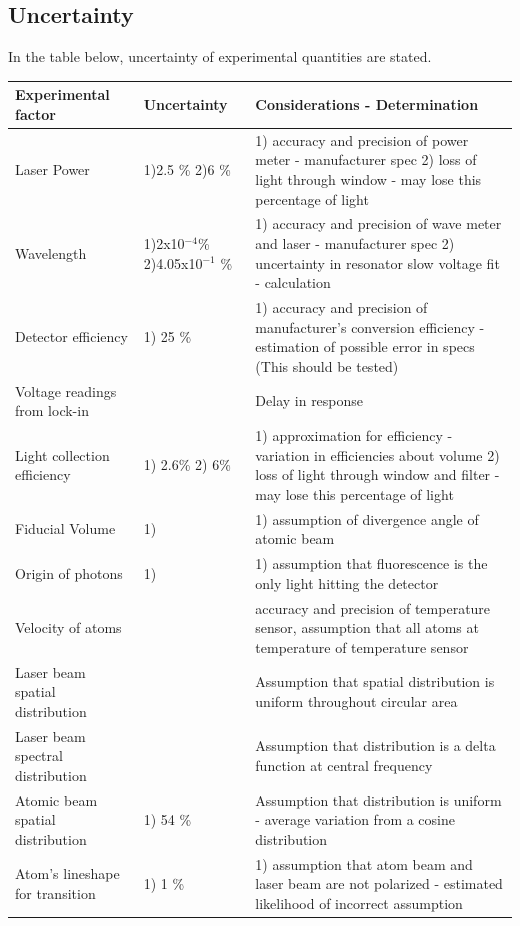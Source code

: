 \documentclass[12pt, a4paper]{article}
\begin{document}
\subsection{Uncertainty}
In the table below, uncertainty of experimental quantities are stated.
\begin{center}
\begin{tabular}{||p{3cm}|p{3cm}|p{8cm}||}
\hline
Experimental factor & Uncertainty & Considerations - Determination\\
\hline\hline
 Laser Power & 1)2.5 \% 2)6 \% & 1) accuracy and precision of power meter - manufacturer spec 2) loss of light through window - may lose this percentage of light\\
\hline
 Wavelength & 1)2x10$^{-4}$\%  2)4.05x10$^{-1}$ \%& 1) accuracy and precision of wave meter and laser - manufacturer spec 2) uncertainty in resonator slow voltage fit - calculation\\
\hline
 Detector efficiency & 1) 25 \% & 1) accuracy and precision of manufacturer's conversion efficiency - estimation of possible error in specs (This should be tested)\\
\hline 
 Voltage readings from lock-in &  & Delay in response \\
\hline
 Light collection efficiency & 1) 2.6\% 2) 6\%& 1) approximation for efficiency - variation in efficiencies about volume 2) loss of light through window and filter - may lose this percentage of light\\
\hline
 Fiducial Volume & 1)  & 1) assumption of divergence angle of atomic beam \\
\hline
 Origin of photons &  1)  & 1) assumption that fluorescence is the only light hitting the detector\\
\hline
 Velocity of atoms &  & accuracy and precision of temperature sensor, assumption that all atoms at temperature of temperature sensor \\
\hline
 Laser beam spatial distribution &  & Assumption that spatial distribution is uniform throughout circular area \\
\hline
 Laser beam spectral distribution &  & Assumption that distribution is a delta function at central frequency \\
\hline
 Atomic beam spatial distribution & 1) 54 \% & Assumption that distribution is uniform - average variation from a cosine distribution \\
 \hline
 Atom's lineshape for transition & 1) 1 \%  & 1) assumption that atom beam and laser beam are not polarized - estimated likelihood of incorrect assumption\\
 \hline
\end{tabular}
\end{center}
\end{document}
